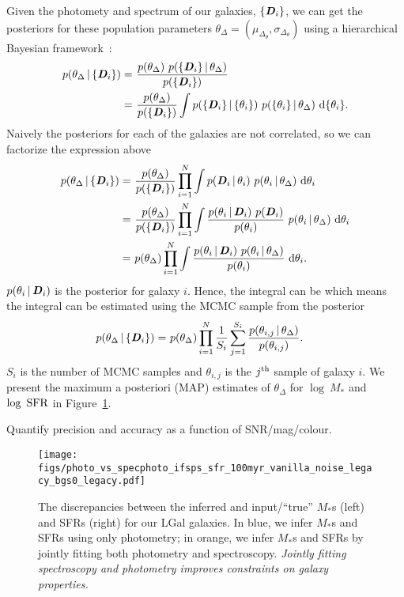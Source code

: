 Given the photomety and spectrum of our galaxies, $\{{\textbf{\textit{D}}}_i\}$, we can get the posteriors
for these population parameters $\theta_\Delta = (\mu_{\Delta_{\theta}}, \sigma_{\Delta_{\theta}})$ 
using a hierarchical Bayesian framework~\citep{hogg2010a}: 
\begin{align}
p(\theta_\Delta \,|\, \{{\textbf{\textit{D}}_i}\}) 
    =&~\frac{p(\theta_\Delta)~p( \{{\textbf{\textit{D}}_i}\} \,|\, \theta_{\Delta})}{p(\{{\textbf{\textit{D}}_i}\})}\\
    =&~\frac{p(\theta_\Delta)}{p(\{{\textbf{\textit{D}}_i}\})}\int p(\{{\textbf{\textit{D}}_i}\} \,|\, \{\theta_i\})~p(\{\theta_i\} \,|\, \theta_\Delta)~{\rm d}\{\theta_i\}.
\end{align} 
Naively the posteriors for each of the galaxies are not correlated, so we can factorize the expression above
\begin{align}
p(\theta_\Delta \,|\, \{{\textbf{\textit{D}}_i}\}) 
    =&~\frac{p(\theta_\Delta)}{p(\{{\textbf{\textit{D}}_i}\})}\prod\limits_{i=1}^N\int p({\textbf{\textit{D}}_i} \,|\, \theta_i)~p(\theta_i \,|\, \theta_\Delta)~{\rm d}\theta_i\\
    =&~\frac{p(\theta_\Delta)}{p(\{{\textbf{\textit{D}}_i}\})}\prod\limits_{i=1}^N\int \frac{p(\theta_i \,|\, {\textbf{\textit{D}}_i})~p({\textbf{\textit{D}}_i})}{p(\theta_i)}~p(\theta_i \,|\, \theta_\Delta)~{\rm d}\theta_i\\
    =&~p(\theta_\Delta)\prod\limits_{i=1}^N\int \frac{p(\theta_i \,|\, {\textbf{\textit{D}}_i})~p(\theta_i \,|\, \theta_\Delta)}{p(\theta_i)}~{\rm d}\theta_i.
\end{align} 
$p(\theta_i \,|\, {\textbf{\textit{D}}_i})$ is the posterior for galaxy $i$. Hence, the
integral can be which means the integral can be estimated using the MCMC sample
from the posterior
\begin{align}
p(\theta_\Delta \,|\, \{{\textbf{\textit{D}}_i}\}) 
    =&~p(\theta_\Delta)\prod\limits_{i=1}^N\frac{1}{S_i}\sum\limits_{j=1}^{S_i}
    \frac{p(\theta_{i,j} \,|\, \theta_\Delta)}{p(\theta_{i,j})}.
\end{align} 
$S_i$ is the number of MCMC samples and $\theta_{i,j}$ is the $j^{\rm th}$
sample of galaxy $i$. We present the maximum a posteriori (MAP) estimates of
$\theta_\Delta$ for $\log~M_*$ and $\log~{\rm SFR}$ in
Figure~\ref{fig:specphoto}. 


Quantify precision and accuracy as a function of SNR/mag/colour. 

\begin{figure}
\begin{center}
\texttt{[image: figs/photo\_vs\_specphoto\_ifsps\_sfr\_100myr\_vanilla\_noise\_legacy\_bgs0\_legacy.pdf]} 
\caption{The discrepancies between the inferred and input/``true'' $M_*$s (left) and SFRs 
(right) for our {\sc LGal} galaxies. In blue, we infer $M_*$s and SFRs using only photometry;
in orange, we infer $M_*$s and SFRs by jointly fitting both photometry and spectroscopy. 
{\em Jointly fitting spectroscopy and photometry improves constraints on galaxy properties.}
}
\label{fig:specphoto}
\end{center}
\end{figure}


